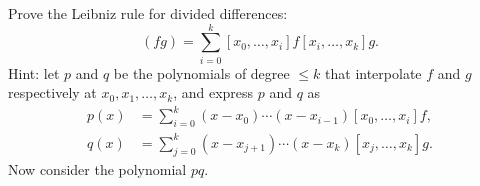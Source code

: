 \begin{exercise}
    Prove the Leibniz rule for divided differences:
    \begin{equation*}
        [x_0, x_1, \ldots, x_k](fg) = \sum_{i=0}^{k} [x_0, \ldots, x_i]f [x_i, \ldots, x_k]g.
    \end{equation*}
    Hint: let $p$ and $q$ be the polynomials of degree $\leq k$ that interpolate $f$ and $g$ respectively at $x_0, x_1, \ldots, x_k$, and express $p$ and $q$ as
    \begin{align*}
        p(x) &= \sum_{i=0}^{k} (x - x_0) \cdots (x - x_{i-1})[x_0, \ldots, x_i]f, \\
        q(x) &= \sum_{j=0}^{k} (x - x_{j+1}) \cdots (x - x_k)[x_j, \ldots, x_k]g.
    \end{align*}
    Now consider the polynomial $pq$.
\end{exercise}

